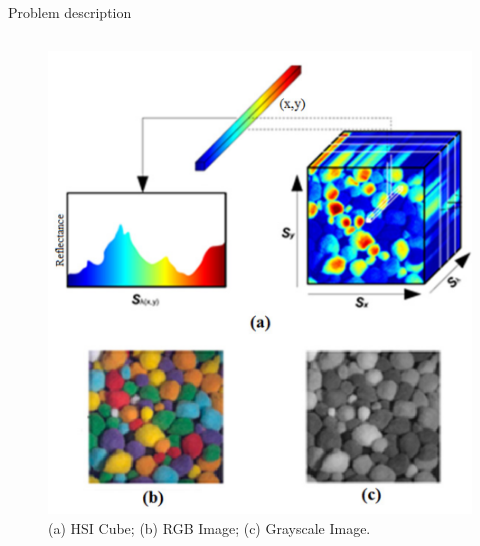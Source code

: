 %

\begin{frame}{Problem description}
    \begin{columns}
        \begin{column}{0.38\textwidth}
            \begin{figure}
            \centering
            \includegraphics[width=1\linewidth]{figures/HSI_example.png}
            \caption{(a) HSI Cube; (b) RGB Image; (c) Grayscale Image. \cite{khanModernTrendsHyperspectral2018}}
            \label{fig:khan-modern}
            \end{figure}
        \end{column}


\end{columns}
\end{frame}
